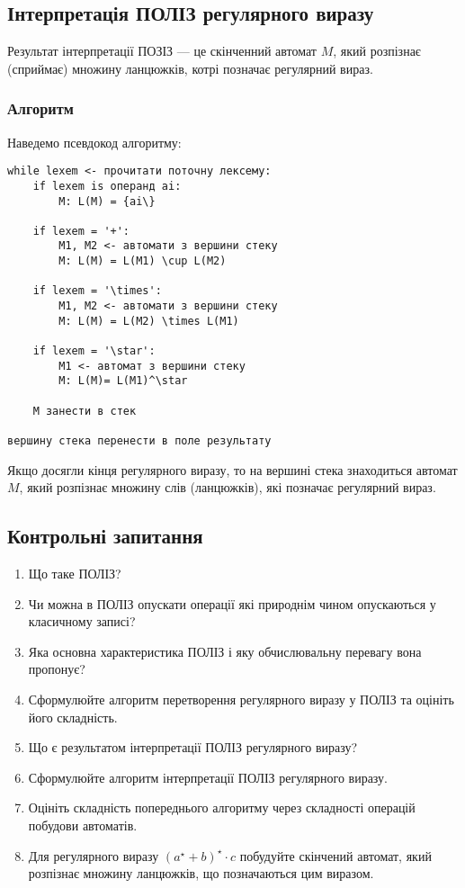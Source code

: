 \subsection{Інтерпретація ПОЛІЗ регулярного виразу}

Результат інтерпретації ПОЗІЗ --- це скінченний автомат $M$, який розпізнає (сприймає) множину ланцюжків, котрі позначає регулярний вираз.

\subsubsection{Алгоритм}

Наведемо псевдокод алгоритму:
\begin{verbatim}
while lexem <- прочитати поточну лексему:
    if lexem is операнд ai:
        M: L(M) = {ai\}
	
    if lexem = '+':
        M1, M2 <- автомати з вершини стеку
        M: L(M) = L(M1) \cup L(M2)
		
    if lexem = '\times':
        M1, M2 <- автомати з вершини стеку
        M: L(M) = L(M2) \times L(M1)

    if lexem = '\star':
        M1 <- автомат з вершини стеку
        M: L(M)= L(M1)^\star

    M занести в стек

вершину стека перенести в поле результату
\end{verbatim}

Якщо досягли кінця регулярного виразу, то на вершині стека знаходиться автомат $M$, який розпізнає множину слів (ланцюжків), які позначає регулярний вираз.

\subsection{Контрольні запитання}

\begin{enumerate}
	\item Що таке ПОЛІЗ?
	\item Чи можна в ПОЛІЗ опускати операції які природнім чином опускаються у класичному записі? %
	\item Яка основна характеристика ПОЛІЗ і яку обчислювальну перевагу вона пропонує? %
	\item Сформулюйте алгоритм перетворення регулярного виразу у ПОЛІЗ та оцініть його складність.
	\item Що є результатом інтерпретації ПОЛІЗ регулярного виразу? %
	\item Сформулюйте алгоритм інтерпретації ПОЛІЗ регулярного виразу.
	\item Оцініть складність попереднього алгоритму через складності операцій побудови автоматів.
	\item Для регулярного виразу $(a^\star + b)^\star \cdot c$ побудуйте скінчений автомат, який розпізнає множину ланцюжків, що позначаються цим виразом.
\end{enumerate}

